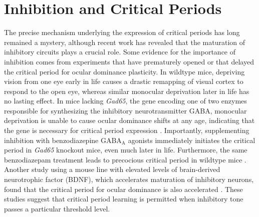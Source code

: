 \section{Inhibition and Critical Periods}
The precise mechanism underlying the expression of critical periods has long remained a mystery, although recent work has revealed that the maturation of inhibitory circuits plays a crucial role. Some evidence for the importance of inhibition comes from experiments that have prematurely opened or that delayed the critical period for ocular dominance plasticity. In wildtype mice, depriving vision from one eye early in life causes a drastic remapping of visual cortex to respond to the open eye, whereas similar monocular deprivation later in life has no lasting effect. In mice lacking \textit{Gad65}, the gene encoding one of two enzymes responsible for synthesizing the inhibitory neurotransmitter GABA, monocular deprivation is unable to cause ocular dominance shifts at any age, indicating that the gene is necessary for critical period expression \cite{Fagiolini2000}. Importantly, supplementing inhibition with benzodiazepine GABA$_\mathrm{A}$ agonists immediately initiates the critical period in \textit{Gad65} knockout mice, even much later in life. Furthermore, the same benzodiazepam treatment leads to precocious critical period in wildtype mice \cite{Fagiolini2000}. Another study using a mouse line with elevated levels of brain-derived neurotrophic factor (BDNF), which accelerates maturation of inhibitory neurons, found that the critical period for ocular dominance is also accelerated \cite{Hanover1999, Huang1999}. These studies suggest that critical period learning is permitted when inhibitory tone passes a particular threshold level.

